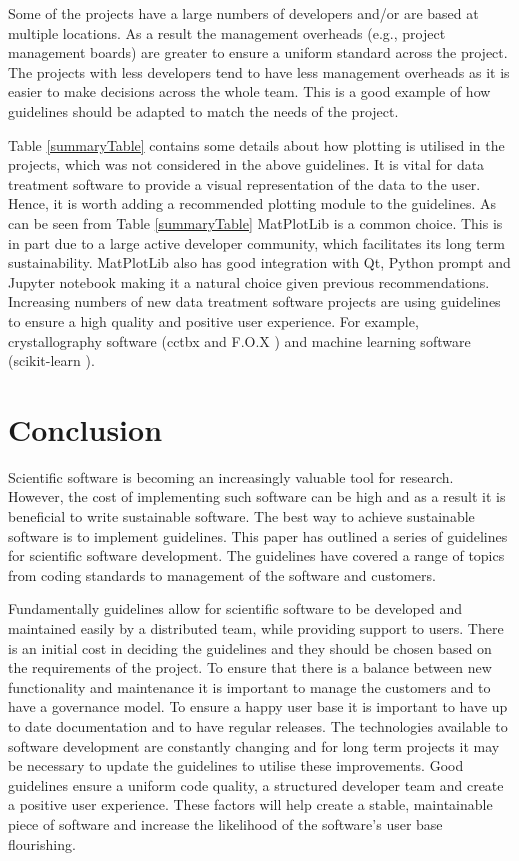 \documentclass[jnr]{iosart2x}
\begin{document}
Some of the projects have a large numbers of developers and/or are based at multiple locations.
As a result the management overheads (e.g., project management boards) are greater to ensure a uniform standard across the project.
The projects with less developers tend to have less management overheads as it is easier to make decisions across the whole team.
This is a good example of how guidelines should be adapted to match the needs of the project.

Table \ref{summaryTable} contains some details about how plotting is utilised in the projects, which was not considered in the above guidelines.
It is vital for data treatment software to provide a visual representation of the data to the user.
Hence, it is worth adding a recommended plotting module to the guidelines.
As can be seen from Table \ref{summaryTable} MatPlotLib is a common choice.
This is in part due to a large active developer community, which facilitates its long term sustainability. 
MatPlotLib also has good integration with Qt, Python prompt and Jupyter notebook making it a natural choice given previous recommendations. 
Increasing numbers of new data treatment software projects are using guidelines to ensure a high quality and positive user experience.
For example, crystallography software (cctbx \cite{} and F.O.X \cite{}) and machine learning software (scikit-learn \cite{}).


\section{Conclusion}
\label{Conclusion}

Scientific software is becoming an increasingly valuable tool for research.
However, the cost of implementing such software can be high and as a result it is beneficial to write sustainable software.
The best way to achieve sustainable software is to implement guidelines.
This paper has outlined a series of guidelines for scientific software development.
The guidelines have covered a range of topics from coding standards to management of the software and customers.

Fundamentally guidelines allow for scientific software to be developed and maintained easily by a distributed team, while providing support to users.
There is an initial cost in deciding the guidelines and they should be chosen based on the requirements of the project.
To ensure that there is a balance between new functionality and maintenance it is important to manage the customers and to have a governance model.
To ensure a happy user base it is important to have up to date documentation and to have regular releases.
The technologies available to software development are constantly changing and for long term projects it may be necessary to update the guidelines to utilise these improvements.
Good guidelines ensure a uniform code quality, a structured developer team and create a positive user experience.
These factors will help create a stable, maintainable piece of software and increase the likelihood of the software's user base flourishing.
\end{document}
